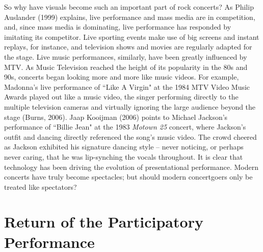 So why have visuals become such an important part of rock concerts? As Philip Auslander (1999) explains, live performance and mass media are in competition, and, since mass media is dominating, live performance has responded by imitating its competitor. Live sporting events make use of big screens and instant replays, for instance, and television shows and movies are regularly adapted for the stage. Live music performances, similarly, have been greatly influenced by MTV. As Music Television reached the height of its popularity in the 80s and 90s, concerts began looking more and more like music videos. For example, Madonna's live performance of ``Like A Virgin" at the 1984 MTV Video Music Awards played out like a music video, the singer performing directly to the multiple television cameras and virtually ignoring the large audience beyond the stage (Burns, 2006). Jaap Kooijman (2006) points to Michael Jackson's performance of ``Billie Jean" at the 1983 \textit{Motown 25} concert, where Jackson's outfit and dancing directly referenced the song's music video. The crowd cheered as Jackson exhibited his signature dancing style -- never noticing, or perhaps never caring, that he was lip-synching the vocals throughout. It is clear that technology has been driving the evolution of presentational performance. Modern concerts have truly become spectacles; but should modern concertgoers only be treated like spectators?


\section{Return of the Participatory Performance}

